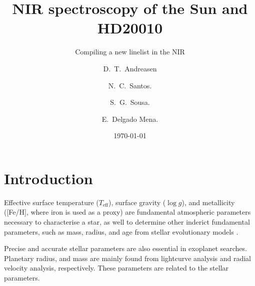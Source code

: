 \documentclass{aa}
\begin{document}
\title{NIR spectroscopy of the Sun and HD20010}
\subtitle{Compiling a new linelist in the NIR}

\subtitle{}

\author{D.~T.~Andreasen
    \and N.~C.~Santos.
    \and S.~G.~Sousa.
    \and E.~Delgado Mena.}









\date{\today}

\abstract{}{}{}{}



\maketitle



\section{Introduction}
\label{sec:introduction}
Effective surface temperature ($T_\mathrm{eff}$), surface gravity ($\log g$),
and metallicity ([Fe/H], where iron is used as a proxy) are fundamental
atmospheric parameters necessary to characterise a star, as well to determine
other inderict fundamental parameters, such as mass, radius, and age from
stellar evolutionary models \citep{Girardi2000}.

Precise and accurate stellar parameters are also essential in exoplanet
searches. Planetary radius, and mass are mainly found from lightcurve
analysis and radial velocity analysis, respectively. These parameters
are related to the stellar parameters.




%
\end{document}

